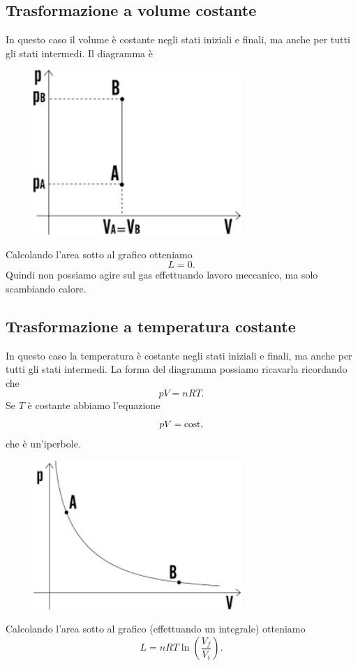 \documentclass{article}
\theoremstyle{definition}
\begin{document}
\subsection{Trasformazione a volume costante}
In questo caso il volume è costante negli stati iniziali e finali, ma anche per tutti gli stati intermedi. Il diagramma è 
\begin{figure}[H]
    \centering
    \includegraphics[width=0.7\textwidth]{images/Vcost.png}
\end{figure} 
Calcolando l'area sotto al grafico otteniamo $$L=0.$$ Quindi non possiamo agire sul gas effettuando lavoro meccanico, ma solo scambiando calore. 

\subsection{Trasformazione a temperatura costante}
In questo caso la temperatura è costante negli stati iniziali e finali, ma anche per tutti gli stati intermedi. La forma del diagramma possiamo ricavarla ricordando che $$pV=nRT.$$ Se $T$ è costante abbiamo l'equazione $$pV=\textup{cost},$$ che è un'iperbole. 
\begin{figure}[H]
    \centering
    \includegraphics[width=0.7\textwidth]{images/Tcost.png}
\end{figure} 
Calcolando l'area sotto al grafico (effettuando un integrale) otteniamo $$L=nRT\ln\left(\frac{V_f}{V_i}\right).$$
\end{document}
